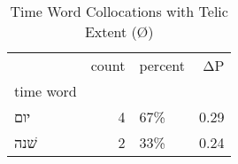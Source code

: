 \begin{table}[htbp!]
\centering
\caption{Time Word Collocations with Telic Extent (Ø)}
\label{table:telicØ_head_cpd}
\begin{tabular}{lrlr}
\toprule
{} &  count & percent &    ΔP \\
time word &        &         &       \\
\midrule
יום       &      4 &     67\% &  0.29 \\
שׁנה      &      2 &     33\% &  0.24 \\
\bottomrule
\end{tabular}
\end{table}
